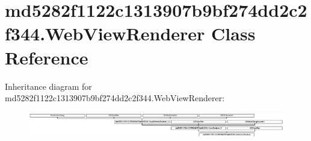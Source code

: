 \hypertarget{classmd5282f1122c1313907b9bf274dd2c2f344_1_1WebViewRenderer}{}\section{md5282f1122c1313907b9bf274dd2c2f344.\+Web\+View\+Renderer Class Reference}
\label{classmd5282f1122c1313907b9bf274dd2c2f344_1_1WebViewRenderer}
Inheritance diagram for md5282f1122c1313907b9bf274dd2c2f344.\+Web\+View\+Renderer\+:\begin{figure}[H]
\begin{center}
\leavevmode
\includegraphics[height=1.098039cm]{classmd5282f1122c1313907b9bf274dd2c2f344_1_1WebViewRenderer}
\end{center}
\end{figure}

